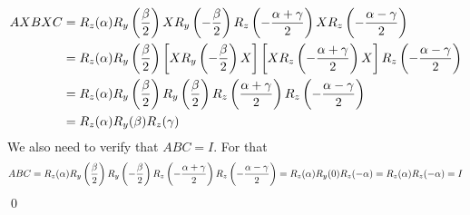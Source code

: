 \documentclass[a4paper, 11pt]{article}
\renewenvironment{proof}{\noindent{\it \textbf{Proof:}}\hspace*{1em}}{\qed\bigskip\\}
\begin{document}
{\begin{proof}
		\begin{align*}
			AXBXC & = R_z(\alpha)R_y\left(\frac{\beta}2\right)XR_y\left(-\frac{\beta}2\right)R_z\left(-\frac{\alpha+\gamma}2\right) X R_z\left(-\frac{\alpha-\gamma}2\right)                     \\
			      & = R_z(\alpha)R_y\left(\frac{\beta}2\right)\left[XR_y\left(-\frac{\beta}2\right) X \right]\left[XR_z\left(-\frac{\alpha+\gamma}2\right)X  \right]R_z\left(-\frac{\alpha-\gamma}2\right) \\
			      & = R_z(\alpha)R_y\left(\frac{\beta}2\right) R_y\left(\frac{\beta}2\right)R_z\left(\frac{\alpha+\gamma}2\right)R_z\left( -\frac{\alpha-\gamma}2\right)                       \\
			      & = R_z(\alpha)R_y(\beta)R_z(\gamma)
		\end{align*}We also need to verify that $ABC=I$. For that $$ABC=R_z(\alpha)R_y\left(\frac{\beta}2\right)R_y\left(-\frac{\beta}{2}\right)R_z\left(-\frac{\alpha+\gamma}2\right)R_z\left(-\frac{\alpha-\gamma}2\right)=R_z(\alpha)R_y(0)R_z(-\alpha)=R_z(\alpha)R_z(-\alpha)=I$$
	\end{proof}
	
}
\end{document}
